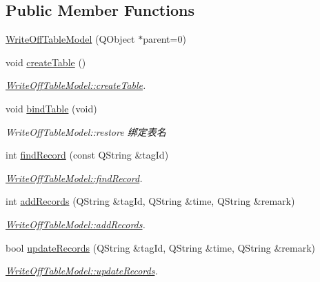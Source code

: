 \subsection*{Public Member Functions}
\begin{DoxyCompactItemize}
\item 
\mbox{\hyperlink{class_write_off_table_model_adb9a959b86ae39cd16910953961696c9}{Write\+Off\+Table\+Model}} (Q\+Object $\ast$parent=0)
\item 
void \mbox{\hyperlink{class_write_off_table_model_a719a7bea132024eb650e1d568566a9ce}{create\+Table}} ()
\begin{DoxyCompactList}\small\item\em \mbox{\hyperlink{class_write_off_table_model_a719a7bea132024eb650e1d568566a9ce}{Write\+Off\+Table\+Model\+::create\+Table}}. \end{DoxyCompactList}\item 
void \mbox{\hyperlink{class_write_off_table_model_a188ceddedd586ee4b6eef04c37a20da3}{bind\+Table}} (void)
\begin{DoxyCompactList}\small\item\em Write\+Off\+Table\+Model\+::restore 绑定表名 \end{DoxyCompactList}\item 
int \mbox{\hyperlink{class_write_off_table_model_a7131d818db04f4bd4cc6aac041318741}{find\+Record}} (const Q\+String \&tag\+Id)
\begin{DoxyCompactList}\small\item\em \mbox{\hyperlink{class_write_off_table_model_a7131d818db04f4bd4cc6aac041318741}{Write\+Off\+Table\+Model\+::find\+Record}}. \end{DoxyCompactList}\item 
int \mbox{\hyperlink{class_write_off_table_model_a695b8631dc0a1cb72f306a4d8cd811f8}{add\+Records}} (Q\+String \&tag\+Id, Q\+String \&time, Q\+String \&remark)
\begin{DoxyCompactList}\small\item\em \mbox{\hyperlink{class_write_off_table_model_a695b8631dc0a1cb72f306a4d8cd811f8}{Write\+Off\+Table\+Model\+::add\+Records}}. \end{DoxyCompactList}\item 
bool \mbox{\hyperlink{class_write_off_table_model_a934ac0b55995b6259095f05b9546a08e}{update\+Records}} (Q\+String \&tag\+Id, Q\+String \&time, Q\+String \&remark)
\begin{DoxyCompactList}\small\item\em \mbox{\hyperlink{class_write_off_table_model_a934ac0b55995b6259095f05b9546a08e}{Write\+Off\+Table\+Model\+::update\+Records}}. \end{DoxyCompactList}\end{DoxyCompactItemize}
